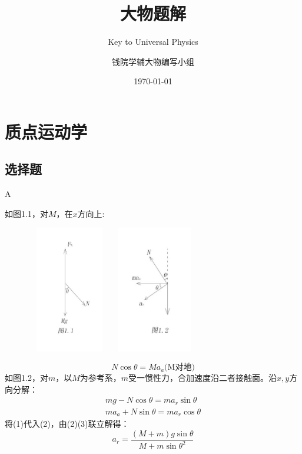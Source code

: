 \documentclass[b5paper,opensource,sourcefont,parskip]{qyxf-book}
\title{大物题解}
\subtitle{Key to Universal Physics}
\author{钱院学辅大物编写小组}
\date{\today}
\begin{document}
\maketitle
\tableofcontents

\setlength{\parindent}{0pt}
\chapter{质点运动学}
\section{选择题}
A

\solve 如图1.1，对$M$，在$x$方向上:
\begin{figure}[htbp]
	\centering
	\includegraphics[width=10em,height=15em]{Chp1_illus1.png}
	\quad
	\centering
	\includegraphics[width=10em,height=15em]{Chp1_illus2.png}
\end{figure}
\begin{equation}
N\cos\theta=Ma_a\text{(M对地)}
\end{equation}
如图1.2，对$m$，以$M$为参考系，$m$受一惯性力，合加速度沿二者接触面。沿$x,y$方向分解：
\begin{gather}
mg-N\cos\theta=ma_r\sin\theta\\
ma_a+N\sin\theta=ma_r\cos\theta
\end{gather}
将(1)代入(2)，由(2)(3)联立解得：
\[a_r=\dfrac{(M+m)g\sin\theta}{M+m{\sin\theta}^2}\]
\end{document}
